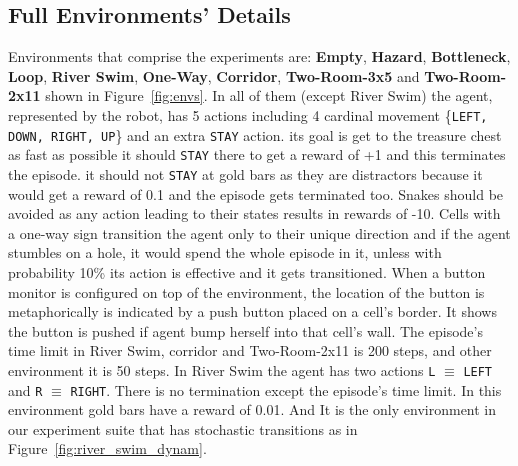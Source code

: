 \subsection{Full Environments' Details}
\label{appendix:env_details}
Environments that comprise the experiments are: \textbf{Empty}, \textbf{Hazard}, \textbf{Bottleneck}, \textbf{Loop}, \textbf{River Swim}, \textbf{One-Way}, \textbf{Corridor}, \textbf{Two-Room-3x5} and \textbf{Two-Room-2x11} shown in Figure~\ref{fig:envs}. In all of them (except River Swim) the agent, represented by the robot, has 5 actions including 4 cardinal movement \{\texttt{LEFT, DOWN, RIGHT, UP}\} and an extra \texttt{STAY} action. its goal is get to the treasure chest as fast as possible it should \texttt{STAY} there to get a reward of +1 and this terminates the episode. it should not \texttt{STAY} at gold bars as they are distractors because it would get a reward of 0.1 and the episode gets terminated too. Snakes should be avoided as any action leading to their states results in rewards of -10. Cells with a one-way sign transition the agent only to their unique direction and if the agent stumbles on a hole, it would spend the whole episode in it, unless with probability 10\% its action is effective and it gets transitioned. When a button monitor is configured on top of the environment, the location of the button is metaphorically is indicated by a push button placed on a cell's border. It shows the button is pushed if agent bump herself into that cell's wall. The episode's time limit in River Swim, corridor and Two-Room-2x11 is 200 steps, and other environment it is 50 steps. In River Swim the agent has two actions \texttt{L} $\equiv$ \texttt{LEFT} and \texttt{R} $\equiv$ \texttt{RIGHT}. There is no termination except the episode's time limit. In this environment gold bars have a reward of 0.01. And It is the only environment in our experiment suite that has stochastic transitions as in Figure~\ref{fig:river_swim_dynam}.
%
